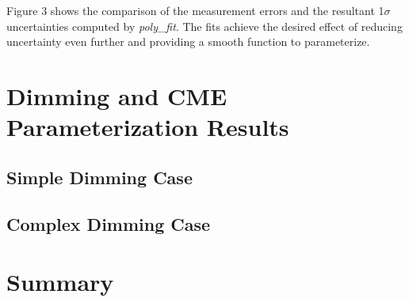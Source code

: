 Figure 3 shows the comparison of the measurement errors and the resultant 1$\sigma$ uncertainties computed by \textit{poly{\_}fit}. The fits achieve the desired effect of reducing uncertainty even further and providing a smooth function to parameterize.



\section{Dimming and CME Parameterization Results}
\label{sec:casestudyresults}

\subsection{Simple Dimming Case}

\subsection{Complex Dimming Case}

\section{Summary}














